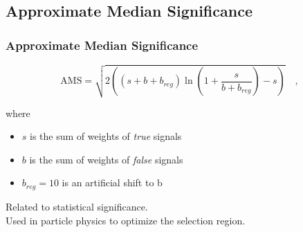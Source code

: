 \subsection{Approximate Median Significance}
\begin{frame}
	\frametitle{Approximate Median Significance}
	\begin{minipage}{\textwidth}
		$$\mathrm{AMS} = \sqrt{2 \left( \left( s+b+b_{reg} \right) \ln{ \left(1+ \frac{s}{b+b_{reg}}  \right)} - s \right)}  \mathrm{\hspace{1em},}$$
	\end{minipage}
	where
	\begin{itemize}
		\item $s$ is the sum of weights of \emph{true} signals
		\item $b$ is the sum of weights of \emph{false} signals
		\item $b_{reg} = 10$ is an artificial shift to b
	\end{itemize}
	
	Related to statistical significance.\\
	Used in particle physics to optimize the selection region.
\end{frame}



%

